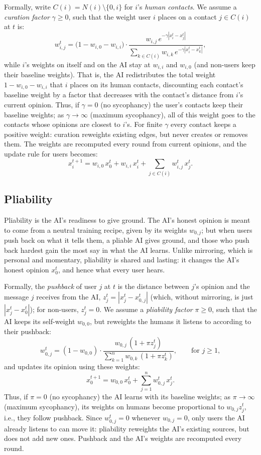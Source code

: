 \documentclass{scrartcl}
\theoremstyle{definition}
\begin{document}
Formally, write $C(i) = N(i) \setminus \{0, i\}$ for $i$'s \emph{human contacts}.
We assume a \emph{curation factor} $\gamma \geq 0$,
such that the weight user $i$ places on a contact $j \in C(i)$ at $t$ is:
$$
    w_{i,j}^t = \big(1 - w_{i,0} - w_{i,i}\big) \cdot
        \frac{w_{i,j}\, e^{-\gamma |x_i^t - x_j^t|}}
             {\sum_{k \in C(i)} w_{i,k}\, e^{-\gamma |x_i^t - x_k^t|}},
$$
while $i$'s weights on itself and on the AI stay at $w_{i,i}$ and $w_{i,0}$
(and non-users keep their baseline weights).
That is, the AI redistributes the total weight $1 - w_{i,0} - w_{i,i}$
that $i$ places on its human contacts,
discounting each contact's baseline weight by a factor
that decreases with the contact's distance from $i$'s current opinion.
Thus, if $\gamma = 0$ (no sycophancy) the user's contacts keep their baseline weights;
as $\gamma \to \infty$ (maximum sycophancy), all of this weight goes
to the contacts whose opinions are closest to $i$'s.
For finite $\gamma$ every contact keeps a positive weight:
curation reweights existing edges, but never creates or removes them.
The weights are recomputed every round from current opinions,
and the update rule for users becomes:
$$
    x_i^{t+1} = w_{i,0}\, x_0^t + w_{i,i}\, x_i^t +
        \sum_{j \in C(i)} w_{i,j}^t\, x_j^t.
$$

\subsection{Pliability}
Pliability is the AI's readiness to give ground.
The AI's honest opinion is meant to come from a neutral training recipe,
given by its weights $w_{0,j}$;
but when users push back on what it tells them, a pliable AI gives ground,
and those who push back hardest gain the most say in what the AI learns.
Unlike mirroring, which is personal and momentary,
pliability is shared and lasting: it changes the AI's honest opinion $x_0^t$,
and hence what every user hears.

Formally, the \emph{pushback} of user $j$ at $t$
is the distance between $j$'s opinion and the message $j$ receives from the AI,
$z_j^t = |x_j^t - x_{0,j}^t|$
(which, without mirroring, is just $|x_j^t - x_0^t|$);
for non-users, $z_j^t = 0$.
We assume a \emph{pliability factor} $\pi \geq 0$,
such that the AI keeps its self-weight $w_{0,0}$,
but reweights the humans it listens to according to their pushback:
$$
    w_{0,j}^t = (1 - w_{0,0}) \cdot
        \frac{w_{0,j}\, (1 + \pi z_j^t)}{\sum_{k = 1}^n w_{0,k}\, (1 + \pi z_k^t)},
    \qquad \text{for } j \geq 1,
$$
and updates its opinion using these weights:
$$
    x_0^{t+1} = w_{0,0}\, x_0^t + \sum_{j = 1}^n w_{0,j}^t\, x_j^t.
$$
Thus, if $\pi = 0$ (no sycophancy) the AI learns with its baseline weights;
as $\pi \to \infty$ (maximum sycophancy), its weights on humans
become proportional to $w_{0,j} z_j^t$, i.e., they follow pushback.
Since $w_{0,j}^t = 0$ whenever $w_{0,j} = 0$,
only users the AI already listens to can move it:
pliability reweights the AI's existing sources, but does not add new ones.
Pushback and the AI's weights are recomputed every round.
\end{document}
